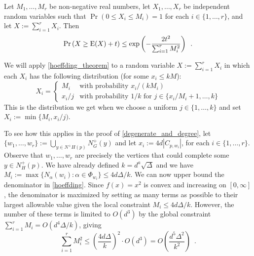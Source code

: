 \documentclass{patmorin}
\begin{document}
\begin{thm}\label{hoeffding_theorem}
  Let $M_1,\ldots,M_r$ be non-negative real numbers, let $X_1,\ldots,X_r$ be independent random variables such that $\Pr(0\le X_i\le M_i)=1$ for each $i\in\{1,\ldots,r\}$, and let $X:=\sum_{i=1}^r X_i$. Then
  \begin{equation}
    \Pr\left(X \ge \mathrm{E}(X)+ t\right)
      \le \exp\left(-\frac{2t^2}{\sum_{i=1}^r M_i^2}\right) \enspace . \label{hoeffding}
  \end{equation}
\end{thm}
We will apply \cref{hoeffding_theorem} to a random variable $X:=\sum_{i=1}^r X_i$ in which each $X_i$ has the following distribution (for some $x_i\le kM$):
\[
  X_i = \begin{cases}
          M_i & \text{with probability $x_i/(kM_i)$} \\
          x_i/j & \text{with probability $1/k$ for $j\in\{x_i/M_i+1,\ldots,k\}$}
        \end{cases}
\]
This is the distribution we get when we choose a uniform $j\in\{1,\ldots,k\}$ and set $X_i:=\min\{M_i,x_i/j)$.


To see how this applies in the proof of \cref{degenerate_and_degree}, let $\{w_1,\ldots,w_r\}:=\bigcup_{y\in N^+H(p)} N^+_G(y)$ and let $x_i:=4d|C_{p,w_i}|$, for each $i\in\{1,\ldots,r\}$.
Observe that $w_1,\ldots,w_r$ are precisely the vertices that could complete some $y\in N^+_H(p)$.  We have already defined $k=d^a\sqrt{\Delta}$ and we have $M_i:=\max\{N_\alpha(w_i):\alpha \in \Phi_{w_i}\}\le 4d\Delta/k$.  We can now upper bound the denominator in \cref{hoeffding}.  Since $f(x)=x^2$ is convex and increasing on $[0,\infty]$, the denominator is maximized by setting as many terms as possible to their largest allowable value given the local constraint $M_i \le 4d\Delta/k$.  However, the number of these terms is limited to $O(d^3)$ by the global constraint $\sum_{i=1}^r M_i= O(d^4\Delta/k)$, giving
\[
    \sum_{i=1}^r M_i^2 \le \left(\frac{4d\Delta}{k}\right)^2\cdot O(d^3) = O\left(\frac{d^5\Delta^2}{k^2}\right) \enspace .
\]

\end{document}
